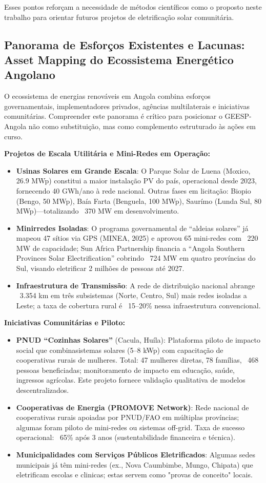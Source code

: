 \documentclass[12pt, a4paper]{article}
\begin{document}
\begin{itemize}
Esses pontos reforçam a necessidade de métodos científicos como o proposto neste trabalho para orientar futuros projetos de eletrificação solar comunitária.

\subsection{Panorama de Esforços Existentes e Lacunas: Asset Mapping do Ecossistema Energético Angolano}

O ecossistema de energias renováveis em Angola combina esforços governamentais, implementadores privados, agências multilaterais e iniciativas comunitárias. Compreender este panorama é crítico para posicionar o GEESP-Angola não como substituição, mas como complemento estruturado às ações em curso.

\textbf{Projetos de Escala Utilitária e Mini-Redes em Operação:}
\begin{itemize}
\item \textbf{Usinas Solares em Grande Escala}: O Parque Solar de Luena (Moxico, 26.9 MWp) constitui a maior instalação PV do país, operacional desde 2023, fornecendo 40 GWh/ano à rede nacional. Outras fases em licitação: Biopio (Bengo, 50 MWp), Baía Farta (Benguela, 100 MWp), Saurímo (Lunda Sul, 80 MWp)—totalizando ~370 MW em desenvolvimento.
\item \textbf{Minirredes Isoladas}: O programa governamental de ``aldeias solares'' já mapeou 47 sítios via GPS (MINEA, 2025) e aprovou 65 mini-redes com ~220 MW de capacidade; Sun Africa Partnership financia a ``Angola Southern Provinces Solar Electrification'' cobrindo ~724 MW em quatro províncias do Sul, visando eletrificar 2 milhões de pessoas até 2027.
\item \textbf{Infraestrutura de Transmissão}: A rede de distribuição nacional abrange ~3.354 km em três subsistemas (Norte, Centro, Sul) mais redes isoladas a Leste; a taxa de cobertura rural é ~15--20\% nessa infraestrutura convencional.
\end{itemize}

\textbf{Iniciativas Comunitárias e Piloto:}
\begin{itemize}
\item \textbf{PNUD ``Cozinhas Solares''}  (Cacula, Huíla): Plataforma piloto de impacto social que combinasistemas solares (5--8 kWp) com capacitação de cooperativas rurais de mulheres. Total: 47 mulheres diretas, 78 famílias, ~468 pessoas beneficiadas; monitoramento de impacto em educação, saúde, ingressos agrícolas. Este projeto fornece validação qualitativa de modelos descentralizados.
\item \textbf{Cooperativas de Energia (PROMOVE Network)}: Rede nacional de cooperativas rurais apoiadas por PNUD/FAO em múltiplas províncias; algumas foram piloto de mini-redes ou sistemas off-grid. Taxa de sucesso operacional: ~65\% após 3 anos (sustentabilidade financeira e técnica).
\item \textbf{Municipalidades com Serviços Públicos Eletrificados}: Algumas sedes municipais já têm mini-redes (ex., Nova Caumbimbe, Mungo, Chipata) que eletrificam escolas e clinicas; estas servem como "provas de conceito" locais.
\end{itemize}


\end{itemize}
\end{document}
